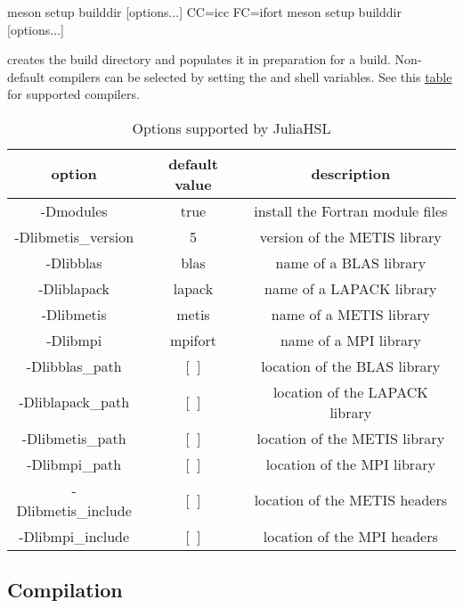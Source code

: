 \documentclass[gdweb]{geradwp}
\begin{document}
\begin{jllisting}
meson setup builddir [options...]
CC=icc FC=ifort meson setup builddir [options...]
\end{jllisting}
creates the build directory  and populates it in preparation for a build.
Non-default compilers can be selected by setting the  and  shell variables.
See this \href{https://mesonbuild.com/Reference-tables.html}{table} for supported compilers.
\begin{table}[ht]
  \label{tab:options}
  \centering
  \begin{tabular}{|c|c|c|}
    \hline
    option              & default value & description                      \\ \hline
    -Dmodules           & true          & install the Fortran module files \\ \hline
    -Dlibmetis\_version & 5             & version of the METIS library     \\ \hline
    -Dlibblas           & blas          & name of a BLAS library           \\ \hline
    -Dliblapack         & lapack        & name of a LAPACK library         \\ \hline
    -Dlibmetis          & metis         & name of a METIS library          \\ \hline
    -Dlibmpi            & mpifort       & name of a MPI library            \\ \hline
    -Dlibblas\_path     & [~]           & location of the BLAS library     \\ \hline
    -Dliblapack\_path   & [~]           & location of the LAPACK library   \\ \hline
    -Dlibmetis\_path    & [~]           & location of the METIS library    \\ \hline
    -Dlibmpi\_path      & [~]           & location of the MPI library      \\ \hline
    -Dlibmetis\_include & [~]           & location of the METIS headers    \\ \hline
    -Dlibmpi\_include   & [~]           & location of the MPI headers      \\ \hline
  \end{tabular}
  \caption{Options supported by JuliaHSL}
\end{table}

\subsection{Compilation}
\end{document}
